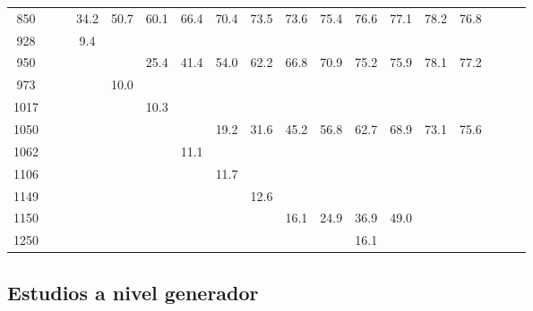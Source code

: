\begin{table}[ht]
{\begin{tabular}{c|ccccccccccccccccc}
    850  &         &        &  34.2    &   50.7   &   60.1   &   66.4   &   70.4    &   73.5    &    73.6  &   75.4  &   76.6 & 77.1 & 78.2 &  76.8 \\
    928  &         &        &   9.4    &          &          &          &           &           &          &         &        &      &      &       \\
    950  &         &        &          &          &   25.4   &   41.4   &   54.0    &   62.2    &    66.8  &   70.9  &   75.2 & 75.9 & 78.1 &  77.2 \\
    973  &         &        &          &   10.0   &          &          &           &           &          &         &        &      &      &       \\
    1017 &         &        &          &          &   10.3   &          &           &           &          &         &        &      &      &       \\
    1050 &         &        &          &          &          &          &   19.2    &   31.6    &    45.2  &   56.8  &   62.7 & 68.9 & 73.1 &  75.6 \\
    1062 &         &        &          &          &          &   11.1   &           &           &          &         &        &      &      &       \\
    1106 &         &        &          &          &          &          &   11.7    &           &          &         &        &      &      &       \\
    1149 &         &        &          &          &          &          &           &   12.6    &          &         &        &      &      &       \\
    1150 &         &        &          &          &          &          &           &           &    16.1  &   24.9  &   36.9 & 49.0 &      &       \\
    1250 &         &        &          &          &          &          &           &           &          &         &   16.1 &      &      &       \\
    \hline
  \end{tabular}
  }
  \label{tab:signal_filter_eff}
\end{table}



\subsection{Estudios a nivel generador}
\label{sec:susy_studies}

